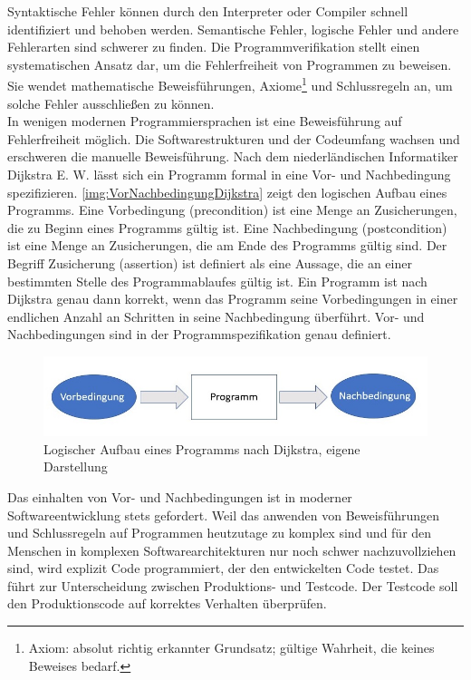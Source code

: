 \documentclass[a4paper,titlepage,halfparskip,12pt]{scrreprt}
\begin{document}
\begin{onehalfspacing}
Syntaktische Fehler können durch den Interpreter oder Compiler schnell identifiziert und behoben werden. Semantische Fehler, logische Fehler und andere Fehlerarten sind schwerer zu finden. Die Programmverifikation stellt einen systematischen Ansatz dar, um die Fehlerfreiheit von Programmen zu beweisen. Sie wendet mathematische Beweisführungen, Axiome\footnote{Axiom: absolut richtig erkannter Grundsatz; gültige Wahrheit, die keines Beweises bedarf.} und Schlussregeln an, um solche Fehler ausschließen zu können.\\
In wenigen modernen Programmiersprachen ist eine Beweisführung auf Fehlerfreiheit möglich. Die Softwarestrukturen und der Codeumfang wachsen und erschweren die manuelle Beweisführung. Nach dem niederländischen Informatiker Dijkstra E. W. lässt sich ein Programm formal in eine Vor- und Nachbedingung spezifizieren. \autoref{img:VorNachbedingungDijkstra} zeigt den logischen Aufbau eines Programms. Eine Vorbedingung (precondition) ist eine Menge an Zusicherungen, die zu Beginn eines Programms gültig ist. Eine Nachbedingung (postcondition) ist eine Menge an Zusicherungen, die am Ende des Programms gültig sind. Der Begriff Zusicherung (assertion) ist definiert als eine Aussage, die an einer bestimmten Stelle des Programmablaufes gültig ist. Ein Programm ist nach Dijkstra genau dann korrekt, wenn das Programm seine Vorbedingungen in einer endlichen Anzahl an Schritten in seine Nachbedingung überführt. Vor- und Nachbedingungen sind in der Programmspezifikation genau definiert.\cite{kirchner2017}

\begin{figure}[h]
	\centering
	\includegraphics[width=\textwidth]{images/VorNachbedingungDijkstra}
	\caption{Logischer Aufbau eines Programms nach Dijkstra, eigene Darstellung}
	\label{img:VorNachbedingungDijkstra}
\end{figure}

Das einhalten von Vor- und Nachbedingungen ist in moderner Softwareentwicklung stets gefordert. Weil das anwenden von Beweisführungen und Schlussregeln auf Programmen heutzutage zu komplex sind und für den Menschen in komplexen Softwarearchitekturen nur noch schwer nachzuvollziehen sind, wird explizit Code programmiert, der den entwickelten Code testet. Das führt zur Unterscheidung zwischen Produktions- und Testcode. Der Testcode soll den Produktionscode auf korrektes Verhalten überprüfen.\cite{kirchner2017}


\end{onehalfspacing}
\end{document}
